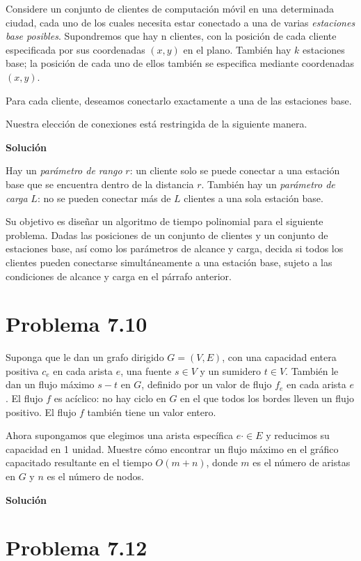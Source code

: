 \documentclass{article}
\begin{document}
Considere un conjunto de clientes de computación móvil en una determinada
ciudad, cada uno de los cuales necesita estar conectado a una de varias
\textit{estaciones base posibles}. Supondremos que hay n clientes, con la
posición de cada cliente especificada por sus coordenadas $(x, y)$ en el plano.
También hay $k$ estaciones base; la posición de cada uno de ellos también se
especifica mediante coordenadas $(x, y)$.

Para cada cliente, deseamos conectarlo exactamente a una de las estaciones base.

Nuestra elección de conexiones está restringida de la siguiente manera.

\textbf{Solución}

Hay un \textit{parámetro de rango} $r$: un cliente solo se puede conectar a una
estación base que se encuentra dentro de la distancia $r$. También hay un
\textit{parámetro de carga} $L$: no se pueden conectar más de $L$ clientes a una
sola estación base.

Su objetivo es diseñar un algoritmo de tiempo polinomial para el siguiente
problema. Dadas las posiciones de un conjunto de clientes y un conjunto de
estaciones base, así como los parámetros de alcance y carga, decida si todos los
clientes pueden conectarse simultáneamente a una estación base, sujeto a las
condiciones de alcance y carga en el párrafo anterior.

\section*{Problema 7.10}

Suponga que le dan un grafo dirigido $G = (V , E)$, con una capacidad entera
positiva $c_e$ en cada arista $e$, una fuente $s \in V$ y un sumidero $t \in V$.
También le dan un flujo máximo $s-t$ en $G$, definido por un valor de flujo
$f_e$ en cada arista $e$. El flujo $f$ es acíclico: no hay ciclo en $G$ en el
que todos los bordes lleven un flujo positivo. El flujo $f$ también tiene un
valor entero.

Ahora supongamos que elegimos una arista específica $e \cdot \in E$ y reducimos su
capacidad en 1 unidad. Muestre cómo encontrar un flujo máximo en el gráfico
capacitado resultante en el tiempo $O(m + n)$, donde $m$ es el número de aristas en
$G$ y $n$ es el número de nodos.

\textbf{Solución}

\section*{Problema 7.12}
\end{document}
